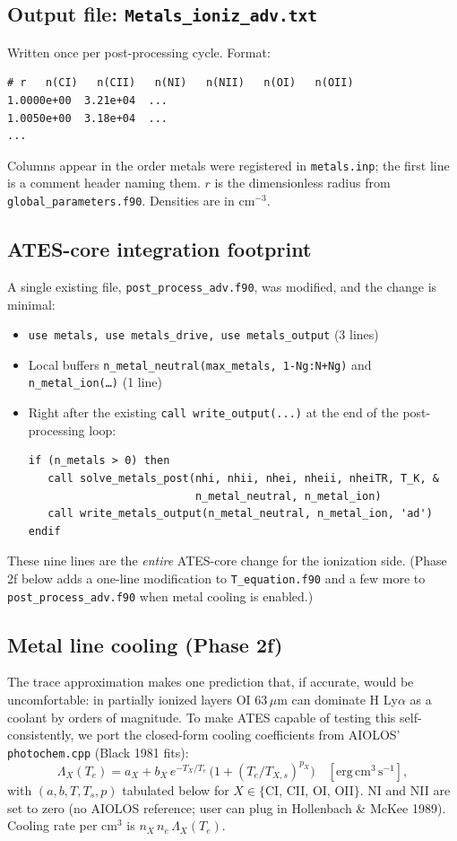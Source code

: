 \documentclass[english,a4paper]{my_memo}
\begin{document}
\subsection{Output file: \texttt{Metals\_ioniz\_adv.txt}}

Written once per post-processing cycle. Format:
\begin{verbatim}
# r   n(CI)   n(CII)   n(NI)   n(NII)   n(OI)   n(OII)
1.0000e+00  3.21e+04  ...
1.0050e+00  3.18e+04  ...
...
\end{verbatim}

Columns appear in the order metals were registered in \texttt{metals.inp};
the first line is a comment header naming them. $r$ is the dimensionless
radius from \texttt{global\_parameters.f90}. Densities are in cm$^{-3}$.

\subsection{ATES-core integration footprint}

A single existing file, \texttt{post\_process\_adv.f90}, was modified, and
the change is minimal:
\begin{itemize}
\item \texttt{use metals, use metals\_drive, use metals\_output} (3 lines)
\item Local buffers \texttt{n\_metal\_neutral(max\_metals, 1-Ng:N+Ng)}
and \texttt{n\_metal\_ion(\dots)} (1 line)
\item Right after the existing \texttt{call write\_output(...)} at the end
of the post-processing loop:
\begin{verbatim}
if (n_metals > 0) then
   call solve_metals_post(nhi, nhii, nhei, nheii, nheiTR, T_K, &
                          n_metal_neutral, n_metal_ion)
   call write_metals_output(n_metal_neutral, n_metal_ion, 'ad')
endif
\end{verbatim}
\end{itemize}

These nine lines are the \emph{entire} ATES-core change for the
ionization side. (Phase 2f below adds a one-line modification to
\texttt{T\_equation.f90} and a few more to \texttt{post\_process\_adv.f90}
when metal cooling is enabled.)

\subsection{Metal line cooling (Phase 2f)}

The trace approximation makes one prediction that, if accurate, would
be uncomfortable: in partially ionized layers OI 63\,$\mu$m can dominate
H Ly$\alpha$ as a coolant by orders of magnitude. To make ATES capable
of testing this self-consistently, we port the closed-form cooling
coefficients from AIOLOS' \texttt{photochem.cpp} (Black 1981 fits):
\[
\Lambda_X(T_e) = a_X + b_X\,e^{-T_X/T_e}\,\big(1 + (T_e/T_{X,\!s})^{p_X}\big)
\quad [\mathrm{erg\,cm^3\,s^{-1}}],
\]
with $(a, b, T, T_s, p)$ tabulated below for $X\in\{$CI, CII, OI, OII$\}$.
NI and NII are set to zero (no AIOLOS reference; user can plug in
Hollenbach \& McKee 1989). Cooling rate per cm$^3$ is $n_X\,n_e\,\Lambda_X(T_e)$.
\end{document}
